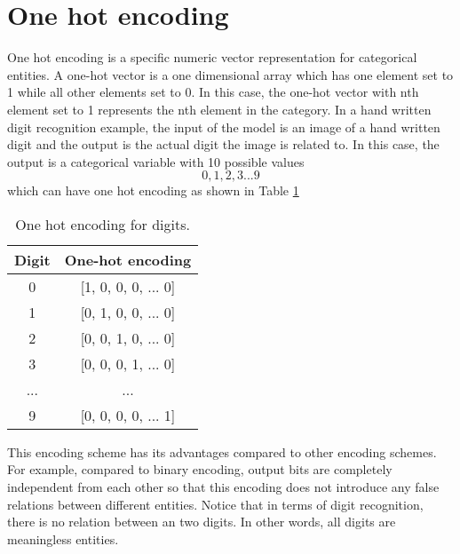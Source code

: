 \section{One hot encoding}
One hot encoding is a specific numeric vector representation for categorical entities. A one-hot vector is a one dimensional array which has one element set to 1 while all other elements set to 0. In this case, the one-hot vector with nth element set to 1 represents the nth element in the category.
In a hand written digit recognition example, the input of the model is an image of a hand written digit and the output is the actual digit the image is related to.
In this case, the output is a categorical variable with 10 possible values
\[0, 1, 2, 3 ... 9\]
which can have one hot encoding as shown in Table \ref{tab:one-hot-encoding}
\begin{table}[ht]\centering
	\caption{One hot encoding for digits.}
	\begin{tabular}{cc} \hline \rowcolor{blue!30}
		Digit & One-hot encoding \\ \hline
		0 & [1, 0, 0, 0, ... 0]       \\ \hline
		1 & [0, 1, 0, 0, ... 0]       \\ \hline
		2 & [0, 0, 1, 0, ... 0]       \\ \hline
		3 & [0, 0, 0, 1, ... 0]       \\ \hline
		... & ...       \\ \hline
		9 & [0, 0, 0, 0, ... 1]       \\ \hline
	\end{tabular}
	\label{tab:one-hot-encoding}
\end{table}
This encoding scheme has its advantages compared to other encoding schemes. For example, compared to binary encoding, output bits are completely independent from each other so that this encoding does not introduce any false relations between different entities. Notice that in terms of digit recognition, there is no relation between an two digits. In other words, all digits are meaningless entities.

